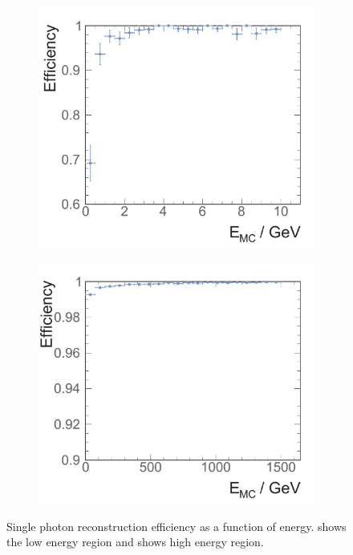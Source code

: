 \begin{figure}[tbph]
\centering
    \begin{subfigure}[b]{0.45\textwidth}
        \includegraphics[width=\textwidth]{photon/singlePhotonEff2fullEdt}
        \caption{}
        \label{fig:photonSingleEffLow}
    \end{subfigure}
    \begin{subfigure}[b]{0.45\textwidth}
        \includegraphics[width=\textwidth]{photon/singlePhotonEffEdt}
        \caption{}
        \label{fig:photonSingleEff}
    \end{subfigure}
\caption[Single photon reconstruction efficiency as a function of energy.]
{Single photon reconstruction efficiency as a function of energy.  shows the low energy region and  shows high energy region.}
\label{fig:photonSingleEffPerformance}
\end{figure}



